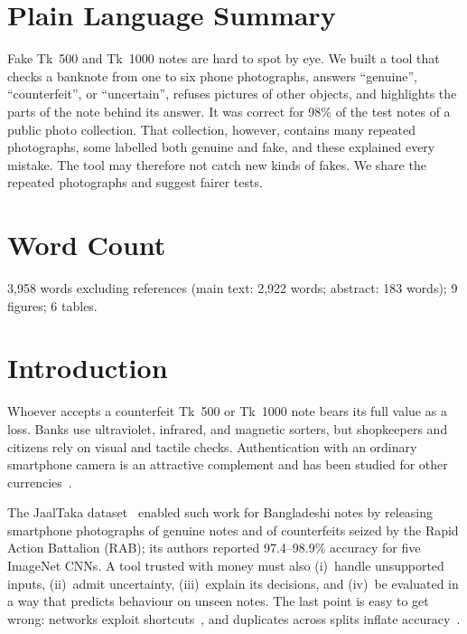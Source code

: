 \documentclass[pdflatex,iicol,sn-mathphys-num]{sn-jnl}
\begin{document}
\section*{Plain Language Summary}
Fake Tk~500 and Tk~1000 notes are hard to spot by eye. We built a tool that checks a
banknote from one to six phone photographs, answers ``genuine'', ``counterfeit'', or
``uncertain'', refuses pictures of other objects, and highlights the parts of the note
behind its answer. It was correct for 98\% of the test notes of a public photo
collection. That collection, however, contains many repeated photographs, some labelled
both genuine and fake, and these explained every mistake. The tool may therefore not
catch new kinds of fakes. We share the repeated photographs and suggest fairer tests.

\section*{Word Count}
3{,}958 words excluding references (main text: 2{,}922 words; abstract: 183 words);
9 figures; 6 tables.

\section{Introduction}\label{sec:intro}

Whoever accepts a counterfeit Tk~500 or Tk~1000 note bears its full value as a loss.
Banks use ultraviolet, infrared, and magnetic sorters, but shopkeepers and citizens rely
on visual and tactile checks. Authentication with an ordinary smartphone camera is an
attractive complement and has been studied for other currencies~\cite{pham2020,pham2022}.

The JaalTaka dataset~\cite{piyas2025jaaltaka} enabled such work for Bangladeshi notes by
releasing smartphone photographs of genuine notes and of counterfeits seized by the Rapid
Action Battalion (RAB); its authors reported 97.4--98.9\% accuracy for five ImageNet
CNNs. A tool trusted with money must also (i)~handle unsupported inputs,
(ii)~admit uncertainty, (iii)~explain its decisions, and (iv)~be evaluated in a way that predicts behaviour on
unseen notes. The last point is easy to get wrong: networks exploit
shortcuts~\cite{geirhos2020shortcut}, and duplicates across splits inflate
accuracy~\cite{kaufman2012leakage,barz2020cifair,kapoor2023leakage}.
\end{document}
